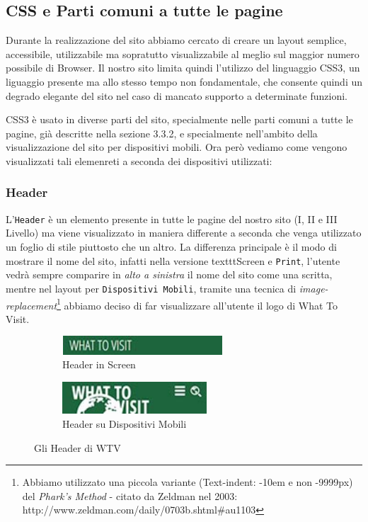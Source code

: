 \subsection{CSS e Parti comuni a tutte le pagine}
Durante la realizzazione del sito abbiamo cercato di creare un layout semplice, accessibile, utilizzabile ma sopratutto visualizzabile al meglio sul maggior numero possibile di Browser. Il nostro sito limita quindi l'utilizzo del linguaggio CSS3, un liguaggio presente ma allo stesso tempo non fondamentale, che consente quindi un degrado elegante del sito nel caso di mancato supporto a determinate funzioni.

CSS3 è usato in diverse parti del sito, specialmente nelle parti comuni a tutte le pagine, già descritte nella sezione 3.3.2, e specialmente nell'ambito della visualizzazione del sito per dispositivi mobili. Ora però vediamo come vengono visualizzati tali elemenreti a seconda dei dispositivi utilizzati:

\subsubsection{Header}\label{sec:Pres-Header}
L'\texttt{Header} è un elemento presente in tutte le pagine del nostro sito
(I, II e III Livello) ma viene visualizzato in maniera differente a seconda
che venga utilizzato un foglio di stile piuttosto che un altro. La differenza
principale è il modo di mostrare il nome del sito, infatti nella versione 
texttt{Screen} e \texttt{Print}, l'utente vedrà sempre comparire in
\textit{alto a sinistra} il nome del sito come una scritta, mentre nel layout
per \texttt{Dispositivi Mobili}, tramite una tecnica di
\textit{image-replacement}\footnote{Abbiamo utilizzato una piccola variante
(Text-indent: -10em e non -9999px) del \textit{Phark's Method} - citato da
Zeldman nel 2003: http://www.zeldman.com/daily/0703b.shtml\#au1103} abbiamo
deciso di far visualizzare all'utente il logo di What To Visit.
\begin{figure}[h!]
  \centering
  \begin{subfigure}[b]{0.3\textwidth}
    \includegraphics[height=0.7cm,width=6cm]{images/pres_header.jpg}
    \caption{Header in Screen}
    \label{fig:Header-screen}
  \end{subfigure}
  \hspace{3cm}
  \begin{subfigure}[b]{0.3\textwidth}
    \includegraphics[height=1.2cm,width=5.4cm]{images/pres_header_m.jpg}
    \caption{Header su Dispositivi Mobili}
    \label{fig:Header-mobile}
  \end{subfigure}
  \caption{Gli Header di WTV}\label{fig:Display-Header}
\end{figure}
